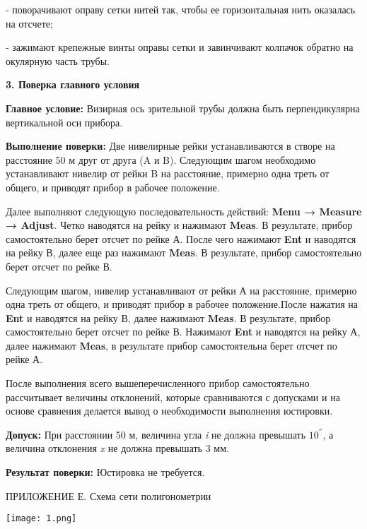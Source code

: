 \documentclass[a4paper]{article}
\begin{document}
{\par - поворачивают оправу сетки нитей так, чтобы ее горизонтальная нить оказалась на отсчете;
\par - зажимают крепежные винты оправы сетки и завинчивают колпачок обратно на окулярную часть трубы.
\par\textbf{3. Поверка главного условия}
\par \textbf{Главное условие:} Визирная ось зрительной трубы должна быть перпендикулярна вертикальной оси прибора.
\par \textbf{Выполнение поверки:} Две нивелирные рейки устанавливаются в створе на расстояние 50 м друг от друга (A и B). Следующим шагом необходимо устанавливают нивелир от рейки B на расстояние, примерно одна треть от общего, и приводят прибор в рабочее положение. 
\par Далее выполняют следующую последовательность действий: \textbf{Menu → Measure → Adjust}. Четко наводятся на рейку и нажимают \textbf{Meas}. В результате, прибор самостоятельно берет отсчет по рейке А. После чего нажимают \textbf{Ent} и наводятся на рейку В, далее еще раз нажимают \textbf{Meas}. В результате, прибор самостоятельно берет отсчет по рейке В.
\par Следующим шагом, нивелир устанавливают от рейки А на расстояние, примерно одна треть от общего, и приводят прибор в рабочее положение.После нажатия на \textbf{Ent} и наводятся на рейку В, далее нажимают \textbf{Meas}. В результате, прибор самостоятельно берет отсчет по рейке В. Нажимают \textbf{Ent} и наводятся на рейку А, далее нажимают \textbf{Meas}, в результате прибор самостоятельна берет отсчет по рейке А.
\par После выполнения всего вышеперечисленного прибор самостоятельно рассчитывает величины отклонений, которые сравниваются с допусками и на основе сравнения делается вывод о необходимости выполнения юстировки.
\par \textbf{Допуск:} При расстоянии 50 м, величина угла \textit{i} не должна превышать $10^{''}$, а величина отклонения \textit{x} не должна превышать 3 мм. 
\par \textbf{Результат поверки:} Юстировка не требуется.
}
\begin{newpage}



%
\begin{newpage}
\begin{flushright}
  \large{ПРИЛОЖЕНИЕ Е. Схема сети полигонометрии}
\end{flushright}
\begin{center}
    \texttt{[image: 1.png]}
\end{center}
\end{newpage}
\end{newpage}
\begin{newpage}

\end{newpage}




\end{document}
